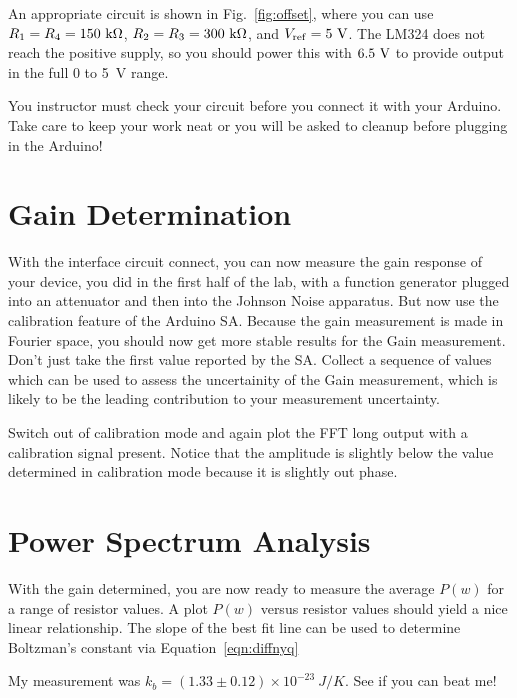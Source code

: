 \documentclass[12pt]{article}
\begin{document}
An appropriate circuit is shown in Fig.~\ref{fig:offset}, where you can use $R_1=R_4=150~{\rm k\Omega}$, 
$R_2=R_3=300~{\rm k\Omega}$,  and $V_{\rm ref}=5~{\rm V}$.  The LM324 does not reach the positive supply, so you should power this with $6.5~{\rm V}$ to provide output in the full 0 to 5~V range.

You instructor must check your circuit before you connect it with your Arduino.  Take care to keep your work neat or you will be asked to cleanup before plugging in the Arduino!

\section{Gain Determination}

With the interface circuit connect, you can now measure the gain response of your device, you did in the first half of the lab, with a function generator plugged into an attenuator and then into the Johnson Noise apparatus.   But now use the calibration feature of the Arduino SA.  Because the gain measurement is made in Fourier space, you should now get more stable results for the Gain measurement.  Don't just take the first value reported by the SA.  Collect a sequence of values which can be used to assess the uncertainity of the Gain measurement, which is likely to be the leading contribution to your measurement uncertainty.

Switch out of calibration mode and again plot the FFT long output with a calibration signal present.  Notice that the amplitude is slightly below the value determined in calibration mode because it is slightly out phase.

\section{Power Spectrum Analysis}

With the gain determined, you are now ready to measure the average $P(w)$ for a range of resistor values.  A plot $P(w)$ versus resistor values should yield a nice linear relationship.  The slope of the best fit line can be used to determine Boltzman's constant via Equation~\ref{eqn:diffnyq}

My measurement was $k_b = (1.33\pm0.12)\times10^{-23}~J/K$.  See if you can beat me!
\end{document}

